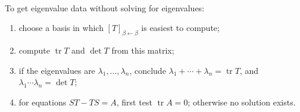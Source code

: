 \begin{method} \label{meth:trace-determinant-invariant-computation} \\
To get eigenvalue data without solving for eigenvalues:
\begin{enumerate}[label=(\roman*)]
\setlength{\itemsep}{0pt}
\item choose a basis in which $[T]_{\beta\leftarrow\beta}$ is easiest to compute;
\item compute $\operatorname{tr}T$ and $\det T$ from this matrix;
\item if the eigenvalues are $\lambda_1,\ldots,\lambda_n$, conclude $\lambda_1+\cdots+\lambda_n=\operatorname{tr}T$, and $\lambda_1\cdots\lambda_n=\det T$;
\item for equations $ST-TS=A$, first test $\operatorname{tr}A=0$; otherwise no solution exists.
\end{enumerate}
\end{method}

